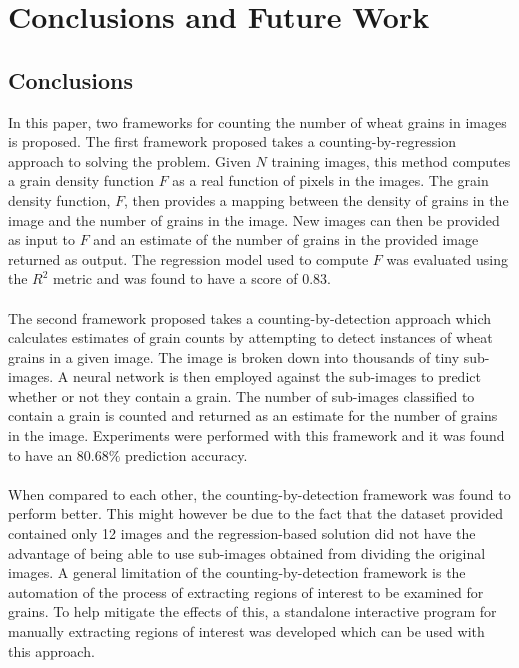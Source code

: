 \def\baselinestretch{1}

\chapter{Conclusions and Future Work}
\section{Conclusions}
In this paper, two frameworks for counting the number of wheat grains in images is proposed. The first framework proposed takes a counting-by-regression approach to solving the problem. Given $N$ training images, this method computes a grain density function $F$ as a real function of pixels in the images. The grain density function, $F$, then provides a mapping between the density of grains in the image and the number of grains in the image. New images can then be provided as input to $F$ and an estimate of the number of grains in the provided image returned as output. The regression model used to compute $F$ was evaluated using the $R^2$ metric and was found to have a score of $0.83$.\\ \\
%
The second framework proposed takes a counting-by-detection approach which calculates estimates of grain counts by attempting to detect instances of wheat grains in a given image. The image is broken down into thousands of tiny sub-images. A neural network is then employed against the sub-images to predict whether or not they contain a grain. The number of sub-images classified to contain a grain is counted and returned as an estimate for the number of grains in the image. Experiments were performed with this framework and it was found to have an $80.68\%$ prediction accuracy.\\ \\
%
When compared to each other, the counting-by-detection framework was found to perform better. This might however be due to the fact that the dataset provided contained only 12 images and the regression-based solution did not have the advantage of being able to use sub-images obtained from dividing the original images. A general limitation of the counting-by-detection framework is the automation of the process of extracting regions of interest to be examined for grains. To help mitigate the effects of this, a standalone interactive program for manually extracting regions of interest was developed which can be used with this approach.  

